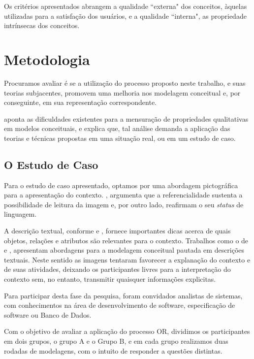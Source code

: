 Os critérios apresentados abrangem a qualidade ``externa" dos conceitos, àquelas utilizadas para a satisfação dos usuários, e a qualidade ``interna", as propriedade intrínsecas dos conceitos. 

\section{\hspace*{3pt} Metodologia}
\label{sec:avaliacaoMetodologia}

Procuramos avaliar é se a utilização do processo proposto neste trabalho, e suas teorias subjacentes, promovem uma melhoria nos modelagem conceitual e, por conseguinte, em sua representação correspondente. 

\citet{castro:2010.abordagem} aponta as dificuldades existentes para a mensuração de propriedades qualitativas em modelos conceituais, e explica que, tal análise demanda a aplicação das teorias e técnicas propostas em uma situação real, ou em um estudo de caso. 

\subsection{\hspace*{3pt}O Estudo de Caso}

Para o estudo de caso apresentado, optamos por uma abordagem pictográfica para a apresentação do contexto. \citet{souza:1998.discurso}, argumenta que a referencialidade sustenta a possibilidade de leitura da imagem e, por outro lado, reafirmam o seu \textit{status} de linguagem. 

A descrição textual, conforme \citet{heuser:2001.projeto} e \citet{machado:2009.projeto}, fornece importantes dicas acerca de quais objetos, relações e atributos são relevantes para o contexto. Trabalhos como o de \citet{castro:2010.abordagem} e \citet{leao:2012.construcao}, apresentam abordagens para a modelagem conceitual pautada em descrições textuais. Neste sentido as imagens tentaram favorecer a explanação do contexto e de suas atividades, deixando os participantes livres para a interpretação do contexto sem, no entanto, transmitir quaisquer informações explicitas.

Para participar desta fase da pesquisa, foram convidados analistas de sistemas, com conhecimentos na área de desenvolvimento de software, especificação de software ou Banco de Dados.

Com o objetivo de avaliar a aplicação do processo OR, dividimos os participantes em dois grupos, o grupo A e o Grupo B, e em cada grupo realizamos duas rodadas de modelagens, com o intuito de responder a questões distintas.

